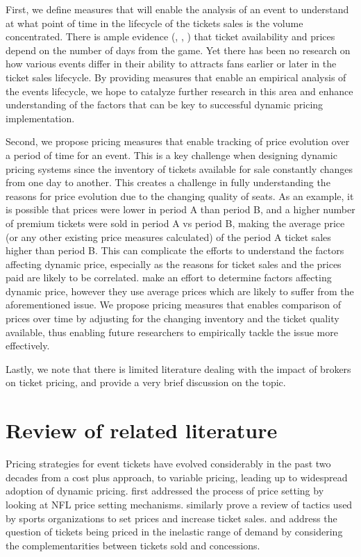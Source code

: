 \documentclass[letterpaper, 12pt]{article}
\begin{document}
First, we define measures that will enable the analysis of an event to understand at what point of time in the lifecycle of the tickets sales is the volume concentrated. There is ample evidence (\cite{drayer2009value}, \cite{shapiro2012new}, \cite{kemper2015factors}) that ticket availability and prices depend on the number of days from the game. Yet there has been no research on how various events differ in their ability to attracts fans earlier or later in the ticket sales lifecycle. By providing measures that enable an empirical analysis of the events lifecycle, we hope to catalyze further research in this area and enhance understanding of the factors that can be key to successful dynamic pricing implementation.

Second, we propose pricing measures that enable tracking of price evolution over a period of time for an event. This is a key challenge when designing dynamic pricing systems since the inventory of tickets available for sale constantly changes from one day to another. This creates a challenge in fully understanding the reasons for price evolution due to the changing quality of seats. As an example, it is possible that prices were lower in period A than period B, and a higher number of premium tickets were sold in period A vs period B, making the average price (or any other existing price measures calculated) of the period A ticket sales higher than period B. This can complicate the efforts to understand the factors affecting dynamic price, especially as the reasons for ticket sales and the prices paid are likely to be correlated. \cite{paul2013determinants} make an effort to determine factors affecting dynamic price, however they use average prices which are likely to suffer from the aforementioned issue. We propose pricing measures that enables comparison of prices over time by adjusting for the changing inventory and the ticket quality available, thus enabling future researchers to empirically tackle the issue more effectively.

Lastly, we note that there is limited literature dealing with the impact of brokers on ticket pricing, and provide a very brief discussion on the topic.

\section{Review of related literature}
Pricing strategies for event tickets have evolved considerably in the past two decades from a cost plus approach, to variable pricing, leading up to widespread adoption of dynamic pricing. \cite{reese2001exploratory} first addressed the process of price setting by looking at NFL price setting mechanisms. \cite{howard2004tactics} similarly prove a review of tactics used by sports organizations to set prices and increase ticket sales. \cite{krautmann2007can} and \cite{coates2007ticket} address the question of tickets being priced in the inelastic range of demand by considering the complementarities between tickets sold and concessions. 
\end{document}

